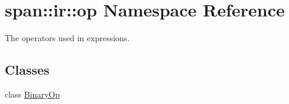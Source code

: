 \hypertarget{namespacespan_1_1ir_1_1op}{}\section{span\+:\+:ir\+:\+:op Namespace Reference}
\label{namespacespan_1_1ir_1_1op}


The operators used in expressions.  


\subsection*{Classes}
\begin{DoxyCompactItemize}
\item 
class \hyperlink{classspan_1_1ir_1_1op_1_1BinaryOp}{Binary\+Op}
\end{DoxyCompactItemize}
